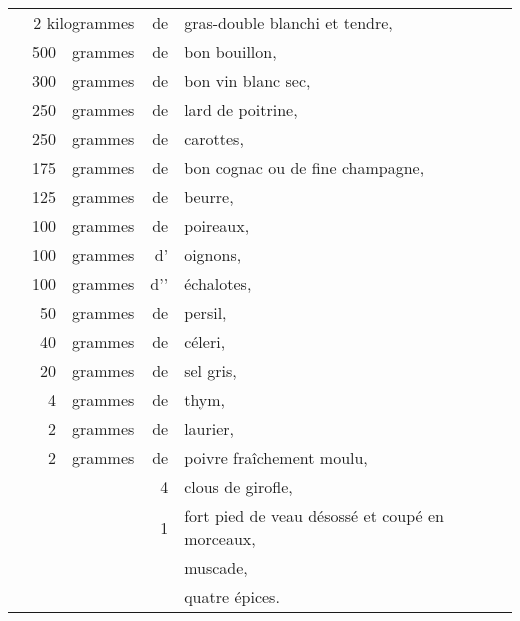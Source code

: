 \footnotesize
\begin{longtable}{rrrrp{18em}}
  & \multicolumn{2}{r}{2 kilogrammes} & de & gras-double blanchi et tendre,                               \\
  & 500 & grammes & de & bon bouillon,                                                                    \\
  & 300 & grammes & de & bon vin blanc sec,                                                               \\
  & 250 & grammes & de & lard de poitrine,                                                                \\
  & 250 & grammes & de & carottes,                                                                        \\
  & 175 & grammes & de & bon cognac ou de fine champagne,                                                 \\
  & 125 & grammes & de & beurre,                                                                          \\
  & 100 & grammes & de & poireaux,                                                                        \\
  & 100 & grammes & d’ & oignons,                                                                         \\
  & 100 & grammes & d’'& échalotes,                                                                       \\
  &  50 & grammes & de & persil,                                                                          \\
  &  40 & grammes & de & céleri,                                                                          \\
  &  20 & grammes & de & sel gris,                                                                        \\
  &   4 & grammes & de & thym,                                                                            \\
  &   2 & grammes & de & laurier,                                                                         \\
  &   2 & grammes & de & poivre fraîchement moulu,                                                        \\
  &     &         &  4 & clous de girofle,                                                                \\
  &     &         &  1 & fort pied de veau désossé et coupé en morceaux,                                  \\
  &     &         &    &  muscade,                                                                        \\
  &     &         &    &  quatre épices.                                                                  \\
\end{longtable}
\normalsize

